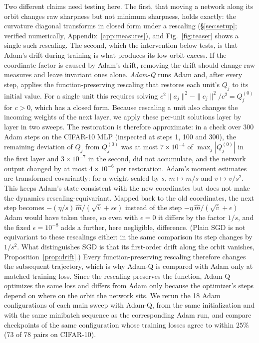\documentclass[10pt]{article}
\theoremstyle{remark}
\begin{document}
Two different claims need testing here. The first, that moving a network along its orbit changes raw sharpness but not minimum sharpness, holds exactly: the curvature diagonal transforms in closed form under a rescaling (\S\ref{sec:setup}; verified numerically, Appendix~\ref{app:measures}), and Fig.~\ref{fig:teaser} shows a single such rescaling. The second, which the intervention below tests, is that Adam's drift during training is what produces its low orbit excess. If the coordinate factor is caused by Adam's drift, removing the drift should change raw measures and leave invariant ones alone. \emph{Adam-Q} runs Adam and, after every step, applies the function-preserving rescaling that restores each unit's $Q_j$ to its initial value. For a single unit this requires solving $c^2\|a_j\|^2-\|c_j\|^2/c^2=Q^{(0)}_j$ for $c>0$, which has a closed form. Because rescaling a unit also changes the incoming weights of the next layer, we apply these per-unit solutions layer by layer in two sweeps. The restoration is therefore approximate: in a check over 300 Adam steps on the CIFAR-10 MLP (inspected at steps 1, 100 and 300), the remaining deviation of $Q_j$ from $Q^{(0)}_j$ was at most $7\times10^{-4}$ of $\max_j|Q^{(0)}_j|$ in the first layer and $3\times10^{-7}$ in the second, did not accumulate, and the network output changed by at most $4\times10^{-6}$ per restoration. Adam's moment estimates are transformed covariantly: for a weight scaled by $s$, $m\mapsto m/s$ and $v\mapsto v/s^2$. This keeps Adam's state consistent with the new coordinates but does not make the dynamics rescaling-equivariant. Mapped back to the old coordinates, the next step becomes $-(\eta/s)\,\hat m/(\sqrt{\hat v}+s\epsilon)$ instead of the step $-\eta\,\hat m/(\sqrt{\hat v}+\epsilon)$ Adam would have taken there, so even with $\epsilon=0$ it differs by the factor $1/s$, and the fixed $\epsilon=10^{-8}$ adds a further, here negligible, difference. (Plain SGD is not equivariant to these rescalings either: in the same comparison its step changes by $1/s^2$. What distinguishes SGD is that its first-order drift along the orbit vanishes, Proposition~\ref{prop:drift}.) Every function-preserving rescaling therefore changes the subsequent trajectory, which is why Adam-Q is compared with Adam only at matched training loss. Since the rescaling preserves the function, Adam-Q optimizes the same loss and differs from Adam only because the optimizer's steps depend on where on the orbit the network sits. We rerun the 18 Adam configurations of each main sweep with Adam-Q, from the same initialization and with the same minibatch sequence as the corresponding Adam run, and compare checkpoints of the same configuration whose training losses agree to within $25\%$ (73 of 78 pairs on CIFAR-10).
\end{document}
